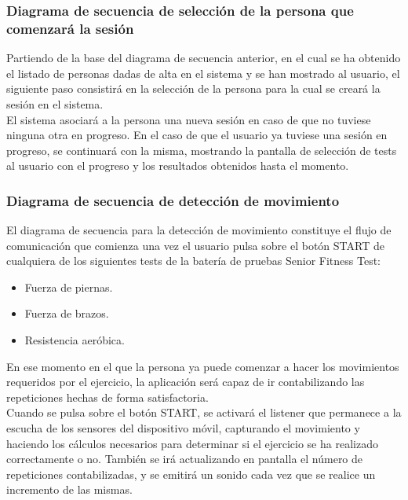 \subsubsection{Diagrama de secuencia de selección de la persona que comenzará la sesión}

Partiendo de la base del diagrama de secuencia anterior, en el cual se ha obtenido el listado de personas dadas de alta en el sistema y se han mostrado al usuario, el siguiente paso consistirá en la selección de la persona para la cual se creará la sesión en el sistema.\\

El sistema asociará a la persona una nueva sesión en caso de que no tuviese ninguna otra en progreso. En el caso de que el usuario ya tuviese una sesión en progreso, se continuará con la misma, mostrando la pantalla de selección de tests al usuario con el progreso y los resultados obtenidos hasta el momento.\\


\subsubsection{Diagrama de secuencia de detección de movimiento}

El diagrama de secuencia para la detección de movimiento constituye el flujo de comunicación que comienza una vez el usuario pulsa sobre el botón START de cualquiera de los siguientes tests de la batería de pruebas Senior Fitness Test:

\begin{itemize}
\item Fuerza de piernas.
\item Fuerza de brazos.
\item Resistencia aeróbica.
\end{itemize}

En ese momento en el que la persona ya puede comenzar a hacer los movimientos requeridos por el ejercicio, la aplicación será capaz de ir contabilizando las repeticiones hechas de forma satisfactoria.\\

Cuando se pulsa sobre el botón START, se activará el listener que permanece a la escucha de los sensores del dispositivo móvil, capturando el movimiento y haciendo los cálculos necesarios para determinar si el ejercicio se ha realizado correctamente o no. También se irá actualizando en pantalla el número de repeticiones contabilizadas, y se emitirá un sonido cada vez que se realice un incremento de las mismas.\\


